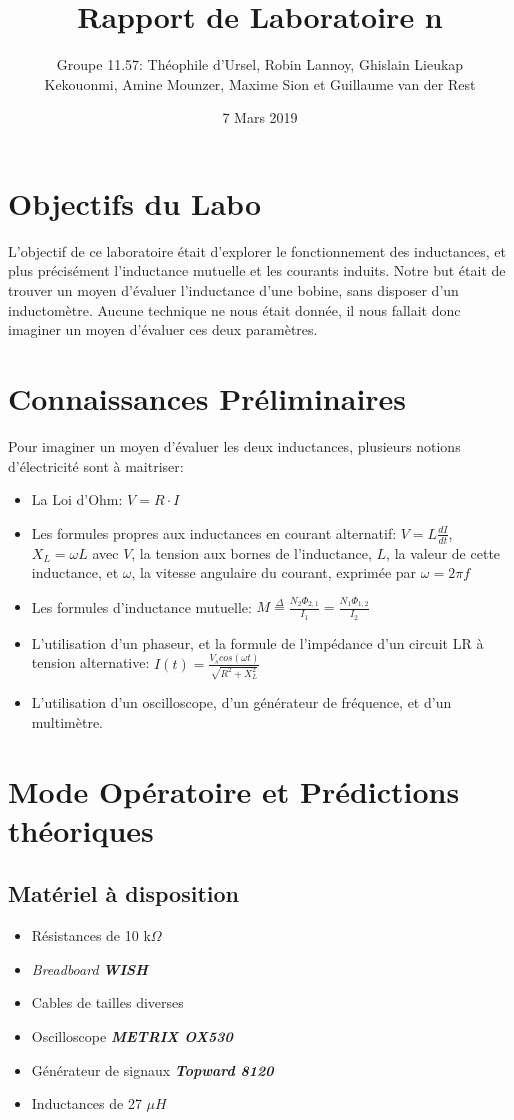 \documentclass{article}
\title{Rapport de Laboratoire n\degree4}
\author{Groupe 11.57: Théophile d'Ursel, Robin Lannoy, Ghislain Lieukap\\ Kekouonmi,
Amine Mounzer, Maxime Sion et Guillaume van der Rest}
\date{7 Mars 2019}
\begin{document}
\maketitle
\section{Objectifs du Labo}
L'objectif de ce laboratoire était d'explorer le fonctionnement des inductances, et plus précisément l'inductance mutuelle
et les courants induits. Notre but était de trouver un moyen d'évaluer l'inductance d'une bobine, sans disposer d'un
inductomètre. Aucune technique ne nous était donnée, il nous fallait donc imaginer un moyen d'évaluer ces deux paramètres.
\section{Connaissances Préliminaires}
Pour imaginer un moyen d'évaluer les deux inductances, plusieurs notions d'électricité sont à maitriser:
\begin{itemize}
    \item La Loi d'Ohm: $V = R\cdot I$
    \item Les formules propres aux inductances en courant alternatif: $V = L \frac{dI}{dt}$, $X_{L} = \omega L$ avec $V$, la tension
    aux bornes de l'inductance, $L$, la valeur de cette inductance, et $\omega$, la vitesse angulaire du courant, exprimée par $\omega = 2\pi f$
    \item Les formules d'inductance mutuelle: $M \overset{\Delta}{=} \frac{N_{2} \Phi_{2,1}}{I_{1}} = \frac{N_{1} \Phi_{1,2}}{I_{2}}$
    \item L'utilisation d'un phaseur, et la formule de l'impédance d'un circuit LR à tension alternative:
    \newline
    $I(t) = \frac{V_{s}cos(\omega t)}{\sqrt{R^{2} + X_{L}^{2}}}$
    \item L'utilisation d'un oscilloscope, d'un générateur de fréquence, et d'un multimètre.
\end{itemize}
\section{Mode Opératoire et Prédictions théoriques}
\subsection{Matériel à disposition}
\begin{itemize}
    \item Résistances de 10 k$\Omega$
    \item \textit{Breadboard} \textbf{\textit{WISH}}
    \item Cables de tailles diverses
    \item Oscilloscope \textit{\textbf{METRIX OX530}}
    \item Générateur de signaux \textit{\textbf{Topward 8120}}
    \item Inductances de 27 $\mu H$
\end{itemize}
\newpage
\end{document}
